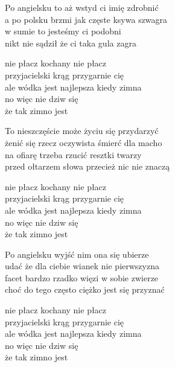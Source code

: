 \begin{text}
    Po angielsku to aż wstyd ci imię zdrobnić\\
    a po polsku brzmi jak częste ksywa szwagra\\
    w sumie to jesteśmy ci podobni\\
    nikt nie sądził że ci taka gula zagra

    nie płacz kochany nie płacz\\
    przyjacielski krąg przygarnie cię\\
    ale wódka jest najlepsza kiedy zimna\\
    no więc nie dziw się\\
    że tak zimno jest

    To nieszczęście może życiu się przydarzyć\\
    żenić się rzecz oczywista śmierć dla macho\\
    na ofiarę trzeba rzucić resztki twarzy\\
    przed ołtarzem słowa przecież nic nie znaczą

    nie płacz kochany nie płacz\\
    przyjacielski krąg przygarnie cię\\
    ale wódka jest najlepsza kiedy zimna\\
    no więc nie dziw się\\
    że tak zimno jest

    Po angielsku wyjść nim ona się ubierze\\
    udać że dla ciebie wianek nie pierwszyzna\\
    facet bardzo rzadko więzi w sobie zwierze\\
    choć do tego często ciężko jest się przyznać

    nie płacz kochany nie płacz\\
    przyjacielski krąg przygarnie cię\\
    ale wódka jest najlepsza kiedy zimna\\
    no więc nie dziw się\\
    że tak zimno jest
\end{text}
\begin{chord}

\end{chord}